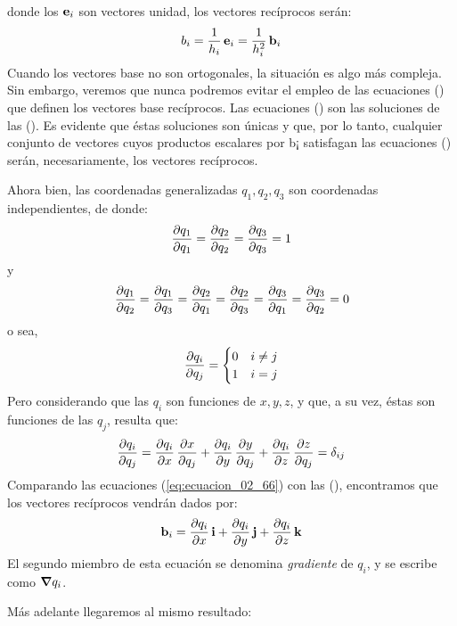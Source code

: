 \documentclass[12pt]{article}
\begin{document}
donde los $\vb{e}_{i}$ son vectores unidad, los vectores recíprocos serán:
\begin{align}
    b_{i} = \dfrac{1}{h_{i}} \, \vb{e}_{i} = \dfrac{1}{h_{i}^{2}} \, \vb{b}_{i}
    \label{eq:ecuacion_02_64}
\end{align}
Cuando los vectores base no son ortogonales, la situación es algo más compleja. Sin embargo, veremos que nunca podremos evitar el empleo de las ecuaciones () que definen los vectores base recíprocos. Las ecuaciones () son las soluciones de las (). Es evidente que éstas soluciones son únicas y que, por lo tanto, cualquier conjunto de vectores cuyos productos escalares por b¡ satisfagan las ecuaciones () serán, necesariamente, los vectores recíprocos. 
\par
Ahora bien, las coordenadas generalizadas $q_{1}, q_{2}, q_{3}$ son coordenadas independientes, de donde:
\begin{align*}
    \pdv{q_{1}}{q_{1}} = \pdv{q_{2}}{q_{2}} = \pdv{q_{3}}{q_{3}} = 1
\end{align*} 
y
\begin{align*}
    \pdv{q_{1}}{q_{2}} = \pdv{q_{1}}{q_{3}} = \pdv{q_{2}}{q_{1}} = \pdv{q_{2}}{q_{3}} = \pdv{q_{3}}{q_{1}} = \pdv{q_{3}}{q_{2}} = 0
\end{align*}
o sea,
\begin{align}
    \pdv{q_{i}}{q_{j}} = \begin{cases}
        0 & i \neq j \\
        1 & i = j
    \end{cases}
    \label{eq:ecuacion_02_65}
\end{align}
Pero considerando que las $q_{i}$ son funciones de $x, y, z$, y que, a su vez, éstas son funciones de las $q_{j}$, resulta que:
\begin{align}
    \pdv{q_{i}}{q_{j}} = \pdv{q_{i}}{x} \, \pdv{x}{q_{j}} + \pdv{q_{i}}{y} \, \pdv{y}{q_{j}} + \pdv{q_{i}}{z} \, \pdv{z}{q_{j}} = \delta_{ij}
    \label{eq:ecuacion_02_66} 
\end{align}
Comparando las ecuaciones (\ref{eq:ecuacion_02_66}) con las (), encontramos que los vectores recíprocos vendrán dados por:
\begin{align}
    \vb{b}_{i} = \pdv{q_{i}}{x} \, \vb{i} + \pdv{q_{i}}{y} \, \vb{j} + \pdv{q_{i}}{z} \, \vb{k}
    \label{eq:ecuacion_02_67}
\end{align}
El segundo miembro de esta ecuación se denomina \emph{gradiente} de $q_{i}$, y se escribe como $\grad{q_{i}}$.
\par
Más adelante llegaremos al mismo resultado:
\end{document}
